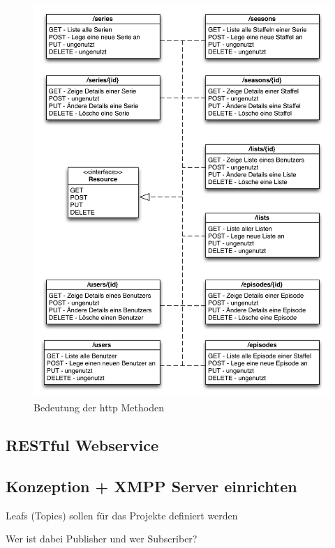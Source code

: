 \documentclass[a4paper]{article}
\begin{document}
\begin{figure}[H]
\includegraphics[width=1\textwidth]{images/bedeutunghttpmethoden.png}
\caption{Bedeutung der http Methoden}
\label{bedeutunghttpmethoden}
\end{figure}

\newpage


\subsection{RESTful Webservice}

\newpage

\subsection{Konzeption + XMPP Server einrichten}
Leafs (Topics) sollen für das Projekte definiert werden

Wer ist dabei Publisher und wer Subscriber?
\end{document}
